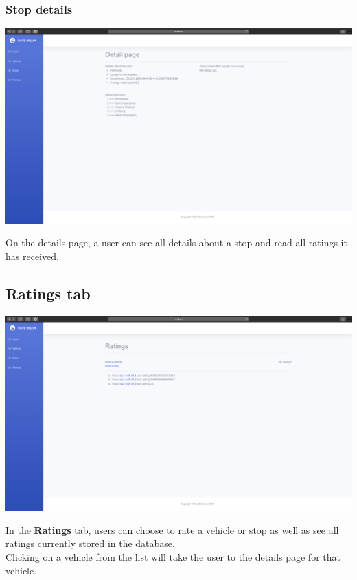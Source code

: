 \documentclass[12pt]{article}
\begin{document}
\subsubsection{Stop details}
\begin{center}
	\includegraphics[width=\linewidth]{Images/Stop_details.png}
\end{center}
On the details page, a user can see all details about a stop and read all ratings it has received.

\subsection{Ratings tab}
\begin{center}
	\includegraphics[width=\linewidth]{Images/Ratings_tab.png}
\end{center}
In the \textbf{Ratings} tab, users can choose to rate a vehicle or stop as well as see all ratings currently stored in the database.\\
Clicking on a vehicle from the list will take the user to the details page for that vehicle.
\end{document}

